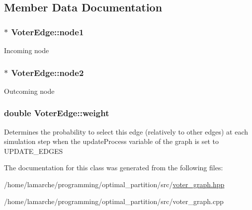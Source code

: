 \subsection{Member Data Documentation}
\hypertarget{classVoterEdge_aaa3e4febee48a905652ba142b8a48b7e}{
\subsubsection[{node1}]{$\ast$ Voter\-Edge\-::node1}}\label{classVoterEdge_aaa3e4febee48a905652ba142b8a48b7e}
Incoming node \hypertarget{classVoterEdge_a2483bd0524c590213c0abd33f7a5de2b}{
\subsubsection[{node2}]{$\ast$ Voter\-Edge\-::node2}}\label{classVoterEdge_a2483bd0524c590213c0abd33f7a5de2b}
Outcoming node \hypertarget{classVoterEdge_a08b1042475d9628a0da0e7ebf8557923}{
\subsubsection[{weight}]{\setlength{\rightskip}{0pt plus 5cm}double Voter\-Edge\-::weight}}\label{classVoterEdge_a08b1042475d9628a0da0e7ebf8557923}
Determines the probability to select this edge (relatively to other edges) at each simulation step when the update\-Process variable of the graph is set to U\-P\-D\-A\-T\-E\-\_\-\-E\-D\-G\-E\-S 

The documentation for this class was generated from the following files\-:\begin{DoxyCompactItemize}
\item 
/home/lamarche/programming/optimal\-\_\-partition/src/\hyperlink{voter__graph_8hpp}{voter\-\_\-graph.\-hpp}\item 
/home/lamarche/programming/optimal\-\_\-partition/src/voter\-\_\-graph.\-cpp\end{DoxyCompactItemize}
